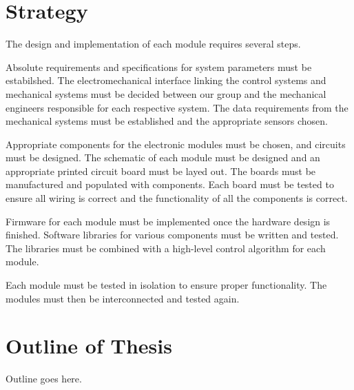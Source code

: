 \section{Strategy}

The design and implementation of each module requires several steps. 

Absolute requirements and specifications for system parameters must be estabilshed. The electromechanical interface linking the control systems and mechanical systems must be decided between our group and the mechanical engineers responsible for each respective system. The data requirements from the mechanical systems must be established and the appropriate sensors chosen.

Appropriate components for the electronic modules must be chosen, and circuits must be designed. The schematic of each module must be designed and an appropriate printed circuit board must be layed out. The boards must be manufactured and populated with components. Each board must be tested to ensure all wiring is correct and the functionality of all the components is correct.

Firmware for each module must be implemented once the hardware design is finished. Software libraries for various components must be written and tested. The libraries must be combined with a high-level control algorithm for each module. 

Each module must be tested in isolation to ensure proper functionality. The modules must then be interconnected and tested again.

\section{Outline of Thesis}

Outline goes here.
